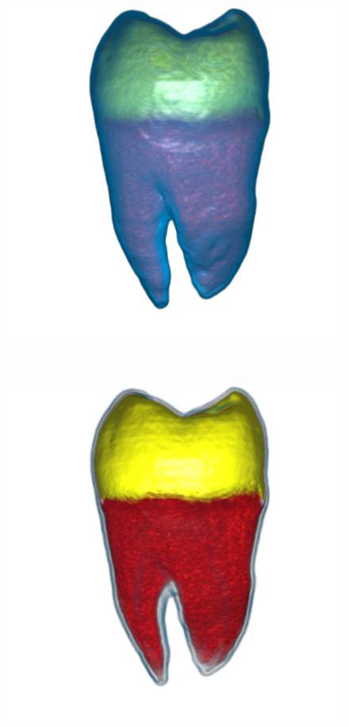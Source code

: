 \begin{figure}
	\centering
	\begin{minipage}{.4\textwidth}
		\includegraphics[width=1\linewidth]{images/tooth_naive}
		\subcaption{}
	\end{minipage}~
	\begin{minipage}{.4\textwidth}
		\includegraphics[width=1\linewidth]{images/tooth_naive_optimized_linesearch}
		\subcaption{}
	\end{minipage}
	

\end{figure}
